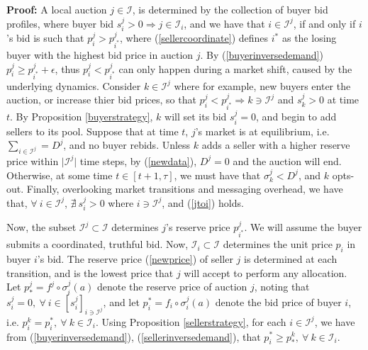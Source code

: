\documentclass[sigconf, anonymous]{acmart}
\newcommand{\mcI}{\mathcal{I}}
\newcommand{\g}{\sigma}
\theoremstyle{definition}
\begin{document}
\textbf{Proof:}
A local auction $j\in\mcI$, is determined by the collection of buyer bid
profiles, where buyer bid $s_i^j > 0 \Rightarrow j\in\mcI_i$, and we have that $i\in\mcI^j$,
if and only if $i$'s bid is such that $p_i^j > p_{i^*}^j$, where
(\ref{sellercoordinate}) defines $i^*$ as the losing buyer with the highest bid
price in auction $j$. By (\ref{buyerinversedemand}) $p_i^j \ge
p_{i^*}^j+\epsilon$, thus $p_i^j < p_{i^*}^j$ can only happen during a market
shift, caused by the underlying dynamics.
Consider $k\in\mcI^j$ where for example, new buyers enter the auction, or increase
thier bid prices, so that $p_i^j < p_{i^*}^j\Rightarrow k\ni\mcI^j$ and
$s_k^j>0$ at time $t$. 
By Proposition \ref{buyerstrategy}, $k$ will set its bid $s_i^j=0$, and begin to add sellers to its pool.
Suppose that at time $t$, $j$'s market is at equilibrium, i.e. $\sum_{i\in\mcI^j} = D^j$, and
no buyer rebids. Unless $k$ adds a seller with a higher reserve
price within $\vert\mcI^j\vert$ time steps, by (\ref{newdata}), $D^j=0$ and the
auction will end. Otherwise, at some time $t\in[t+1,\tau]$, we must have that $\g_k^j <
D^j$, and $k$ opts-out. Finally, overlooking market transitions and messaging
overhead, we have that,
$\forall \ i\in\mcI^j$, $\nexists \ s_i^j > 0$ where $i \ni \mcI^j$, and (\ref{jtoi})
holds.
\iffalse
Furthermore, we note that $\lambda \subset \mcI$ is a complete and disjoint set
of bid vectors with respect to auction $j$. That is, $\forall \ i \in \mcI^j,
s_i^k > 0 \in \lambda$ if and only if $s_i^k>0 \in\mcI$, and so $s_i \in \lambda
\equiv s_i \in \mcI$. (NEED TO ADD TO LEMMA AND PROVE?)
\fi

Now, the subset $\mcI^j \subset \mcI$
determines $j$'s reserve price $p_{i^*}^j$. We will assume the buyer submits a
coordinated, truthful bid. Now, $\mcI_i\subset \mcI$ 
determines the unit price $p_{i}$ in buyer $i$'s bid.
The reserve price (\ref{newprice}) of seller $j$ is determined at each
transition, and is
the lowest price that $j$ will accept to perform any allocation.
Let $p_*^j = f^j \circ \g_i^j(a) $ denote the reserve
price of auction $j$, noting that $s_i^j=0, \ \forall \ i \in
[s_i^j]_{i\ni\mcI^j}$, and let $p_i^*= f_i \circ \g_i^j(a)$ denote the bid price of buyer $i$, i.e. $p_i^k = p_i^*,
\ \forall \ k \in\mcI_i$. 
Using Proposition
\ref{sellerstrategy}, for each $i \in \mcI^j$, we have from (\ref{buyerinversedemand}), (\ref{sellerinversedemand}), that $p_i^* \ge p_*^k,
\ \forall \ k \in\mcI_i$.

\iffalse
Now, we have,
\begin{equation}\label{rho}
    \rho^j(p_*^j) \le \displaystyle\sum_{i\in\mcI^j} e_i(a(s_i^j)),
\end{equation}
from (\ref{datademand}), (\ref{buyerinversedemand}),
(\ref{sellerinversedemand}), and so $p_i^j \ge p_{*}^j \ge p_i^k, \ \forall \ i \in
[p_i^j]_{i\in\mcI^j}$ and $\forall \ k \in [p_i^k]_{k\in\mcI_i}$
\fi
\end{document}

